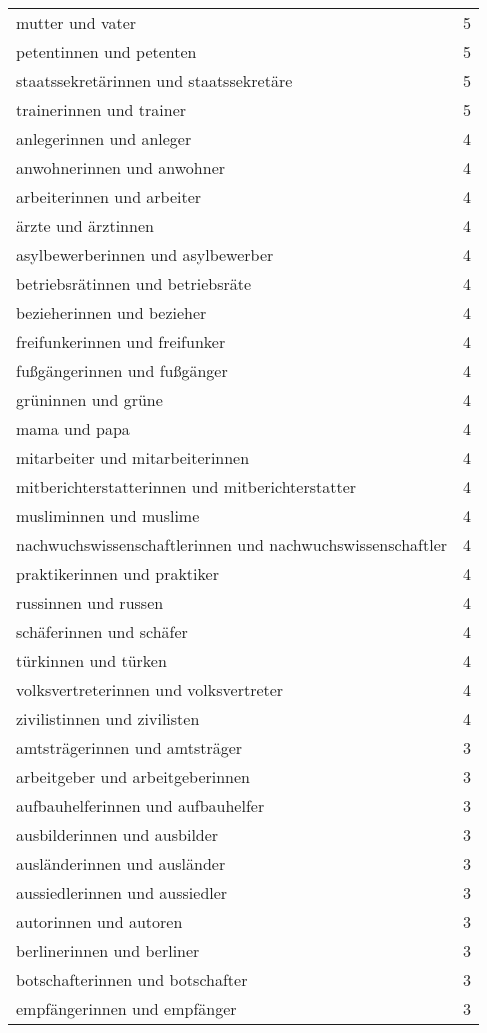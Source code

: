 \begin{tabular}{ll}
mutter und vater & 5\\
petentinnen und petenten & 5\\
staatssekretärinnen und staatssekretäre & 5\\
trainerinnen und trainer & 5\\
anlegerinnen und anleger & 4\\
anwohnerinnen und anwohner & 4\\
arbeiterinnen und arbeiter & 4\\
ärzte und ärztinnen & 4\\
asylbewerberinnen und asylbewerber & 4\\
betriebsrätinnen und betriebsräte & 4\\
bezieherinnen und bezieher & 4\\
freifunkerinnen und freifunker & 4\\
fußgängerinnen und fußgänger & 4\\
grüninnen und grüne & 4\\
mama und papa & 4\\
mitarbeiter und mitarbeiterinnen & 4\\
mitberichterstatterinnen und mitberichterstatter & 4\\
musliminnen und muslime & 4\\
nachwuchswissenschaftlerinnen und nachwuchswissenschaftler & 4\\
praktikerinnen und praktiker & 4\\
russinnen und russen & 4\\
schäferinnen und schäfer & 4\\
türkinnen und türken & 4\\
volksvertreterinnen und volksvertreter & 4\\
zivilistinnen und zivilisten & 4\\
amtsträgerinnen und amtsträger & 3\\
arbeitgeber und arbeitgeberinnen & 3\\
aufbauhelferinnen und aufbauhelfer & 3\\
ausbilderinnen und ausbilder & 3\\
ausländerinnen und ausländer & 3\\
aussiedlerinnen und aussiedler & 3\\
autorinnen und autoren & 3\\
berlinerinnen und berliner & 3\\
botschafterinnen und botschafter & 3\\
empfängerinnen und empfänger & 3\\

\end{tabular}
